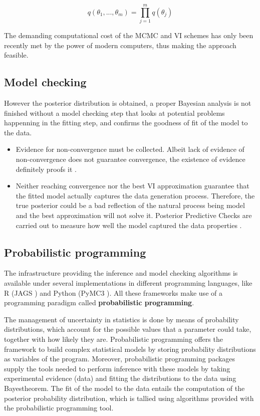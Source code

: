\begin{equation}\label{eq:mean_field}
q(\theta_1, ..., \theta_m) = \prod_{j=1}^{m}{q(\theta_j)}
\end{equation} 

The demanding computational cost of the \ac{MCMC} and \ac{VI} schemes has only been recently met by the power of modern computers, thus making the approach feasible.


\subsection{Model checking}
\label{subsec:model_checking}

However the posterior distribution is obtained, a proper Bayesian analysis is not finished without a model checking step that looks at potential problems happenning in the fitting step, and confirms the goodness of fit of the model to the data.

\begin{itemize}

\item Evidence for non-convergence must be collected. Albeit lack of evidence of non-convergence does not guarantee convergence, the existence of evidence definitely proofs it \cite{Kruschke}.

\item Neither reaching convergence nor the best \ac{VI} approximation guarantee that the fitted model actually captures the data generation process. Therefore, the true posterior could be a bad reflection of the natural process being model and the best approximation will not solve it. Posterior Predictive Checks are carried out to measure how well the model captured the data properties \cite{Kruschke}.

\end{itemize}




\subsection{Probabilistic programming}

The infrastructure providing the inference and model checking algorithms is available under several implementations in different programming languages, like R (JAGS \cite{Plummer}) and Python (PyMC3 \cite{Salvatier2016}). All these frameworks make use of a programming paradigm called \textbf{probabilistic programming}.


The management of uncertainty in statistics is done by means of probability distributions, which account for the possible values that a parameter could take, together with how likely they are. Probabilistic programming offers the framework to build complex statistical models by storing probability distributions as variables of the program. Moreover, probabilistic programming packages supply the tools needed to perform inference with these models by taking experimental evidence (data) and fitting the distributions to the data using Bayes\textquotesingle theorem. The fit of the model to the data entails the computation of the posterior probability distribution, which is tallied using algorithms provided with the probabilistic programming tool.

